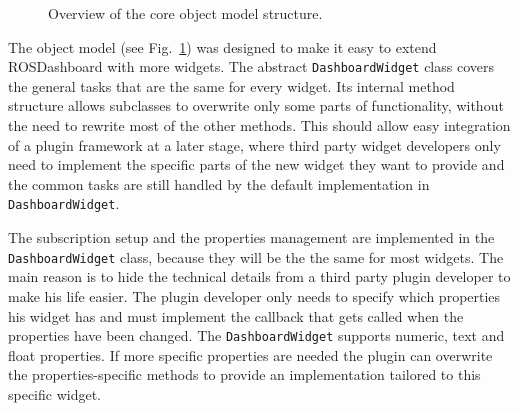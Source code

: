 \begin{figure}[thpb]
  \centering
  \caption{Overview of the core object model structure.}
  \label{class overview}
\end{figure}

The object model (see Fig.~\ref{class overview}) was designed to make it easy to extend ROSDashboard with more widgets. The abstract \texttt{DashboardWidget} class covers the general tasks that are the same for every widget. Its internal method structure allows subclasses to overwrite only some parts of functionality, without the need to rewrite most of the other methods. This should allow easy integration of a plugin framework at a later stage, where third party widget developers only need to implement the specific parts of the new widget they want to provide and the common tasks are still handled by the default implementation in \texttt{DashboardWidget}.

The subscription setup and the properties management are implemented in the \texttt{DashboardWidget} class, because they will be the the same for most widgets. The main reason is to hide the technical details from a third party plugin developer to make his life easier. The plugin developer only needs to specify which properties his widget has and must implement the callback that gets called when the properties have been changed. The \texttt{DashboardWidget} supports numeric, text and float properties. If more specific properties are needed the plugin can overwrite the properties-specific methods to provide an implementation tailored to this specific widget.

